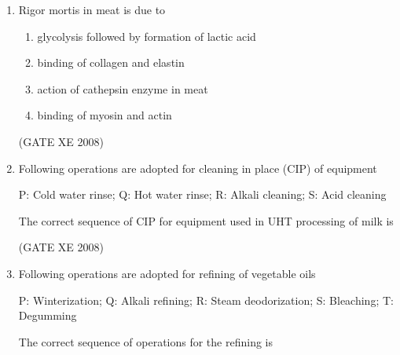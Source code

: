 \documentclass[12pt]{article}
\begin{document}
\begin{enumerate}
\begin{enumerate}
\end{enumerate}

(GATE XE 2008)  

\item Rigor mortis in meat is due to  

\begin{enumerate}
\item  glycolysis followed by formation of lactic acid  
\item  binding of collagen and elastin  
\item  action of cathepsin enzyme in meat  
\item  binding of myosin and actin  
\end{enumerate}

(GATE XE 2008)  

\item Following operations are adopted for cleaning in place (CIP) of equipment  

P: Cold water rinse; Q: Hot water rinse; R: Alkali cleaning; S: Acid cleaning  

The correct sequence of CIP for equipment used in UHT processing of milk is  

\begin{enumerate}
\end{enumerate}

(GATE XE 2008)  

\item Following operations are adopted for refining of vegetable oils  

P: Winterization; Q: Alkali refining; R: Steam deodorization; S: Bleaching; T: Degumming  

The correct sequence of operations for the refining is  


\end{enumerate}
\end{document}

